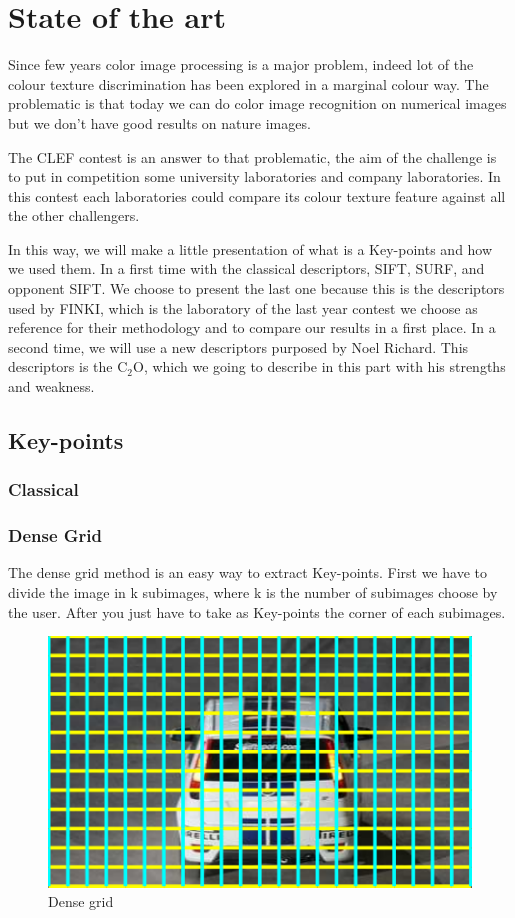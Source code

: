\documentclass[12pt]{article}
\begin{document}
\section{State of the art}

Since few years color image processing is a major problem, indeed lot of the colour texture discrimination has been explored in a marginal colour way. The problematic is that today we can do color image recognition on numerical images but we don't have good results on nature images.

The CLEF contest is an answer to that problematic, the aim of the challenge is to put in competition some university laboratories and company laboratories. In this contest each laboratories could compare its colour texture feature against all the other challengers.

In this way, we will make a little presentation of what is a Key-points and how we used them. In a first time with the classical descriptors, SIFT, SURF, and opponent SIFT. We choose to present the last one because this is the descriptors used by FINKI, which is the laboratory of the last year contest we choose as reference for their methodology and to compare our results in a first place. In a second time, we will use a new descriptors purposed by Noel Richard. This descriptors is the C$_2$O, which we going to describe in this part with his strengths and weakness.   

\subsection{Key-points}

\subsubsection{Classical}

\subsubsection{Dense Grid}

The dense grid method is an easy way to extract Key-points. First we have to divide the image in k subimages, where k is the number of subimages choose by the user. After you just have to take as Key-points the corner of each subimages. 

\begin{figure}[h]
    \center
    \includegraphics[scale=1]{Dense_grid.png}
    \caption{Dense grid}\label{fig:dense_grid}
\end{figure}
\end{document}
